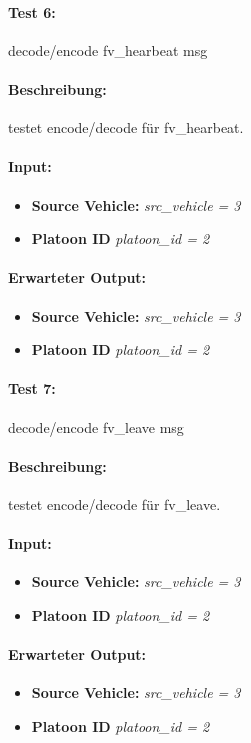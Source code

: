 \documentclass[a4paper, 12pt, titlepage]{scrartcl}
\begin{document}
{			\paragraph{Test 6:}{decode/encode fv\_hearbeat msg}
			\paragraph{Beschreibung:} testet encode/decode für fv\_hearbeat.
			\paragraph{Input:}
			\begin{itemize} \itemsep-0.5em
				\item \textbf{Source Vehicle:} \emph{src\_vehicle = 3}
				\item \textbf{Platoon ID} \emph{platoon\_id = 2}
			\end{itemize}
			\paragraph{Erwarteter Output:}
			\begin{itemize} \itemsep-0.5em
				\item \textbf{Source Vehicle:} \emph{src\_vehicle = 3}
				\item \textbf{Platoon ID} \emph{platoon\_id = 2}
			\end{itemize}

			\paragraph{Test 7:}{decode/encode fv\_leave msg}
			\paragraph{Beschreibung:} testet encode/decode für fv\_leave.
			\paragraph{Input:}
			\begin{itemize} \itemsep-0.5em
				\item \textbf{Source Vehicle:} \emph{src\_vehicle = 3}
				\item \textbf{Platoon ID} \emph{platoon\_id = 2}
			\end{itemize}
			\paragraph{Erwarteter Output:}
			\begin{itemize} \itemsep-0.5em
				\item \textbf{Source Vehicle:} \emph{src\_vehicle = 3}
				\item \textbf{Platoon ID} \emph{platoon\_id = 2}
			\end{itemize}	

}
\end{document}
